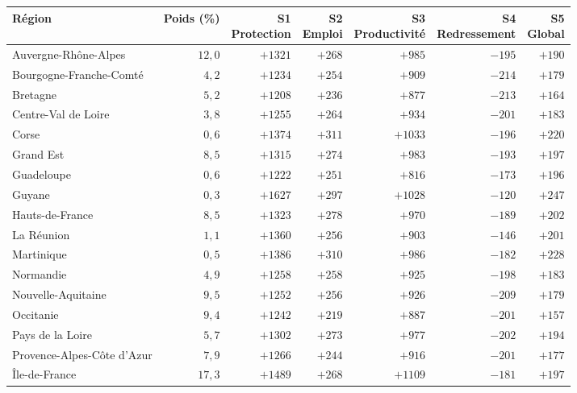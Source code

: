 \begin{tabular}{p{5cm}rrrrrr}\toprule Région & Poids (\%) & \makecell{S1\\Protection} & \makecell{S2\\Emploi} & \makecell{S3\\Productivité} & \makecell{S4\\Redressement} & \makecell{S5\\Global}\\ \midrule
Auvergne-Rhône-Alpes & $12{,}0$ & $+1321$ & $+268$ & $+985$ & $-195$ & $+190$\\
Bourgogne-Franche-Comté & $4{,}2$ & $+1234$ & $+254$ & $+909$ & $-214$ & $+179$\\
Bretagne & $5{,}2$ & $+1208$ & $+236$ & $+877$ & $-213$ & $+164$\\
Centre-Val de Loire & $3{,}8$ & $+1255$ & $+264$ & $+934$ & $-201$ & $+183$\\
Corse & $0{,}6$ & $+1374$ & $+311$ & $+1033$ & $-196$ & $+220$\\
Grand Est & $8{,}5$ & $+1315$ & $+274$ & $+983$ & $-193$ & $+197$\\
Guadeloupe & $0{,}6$ & $+1222$ & $+251$ & $+816$ & $-173$ & $+196$\\
Guyane & $0{,}3$ & $+1627$ & $+297$ & $+1028$ & $-120$ & $+247$\\
Hauts-de-France & $8{,}5$ & $+1323$ & $+278$ & $+970$ & $-189$ & $+202$\\
La Réunion & $1{,}1$ & $+1360$ & $+256$ & $+903$ & $-146$ & $+201$\\
Martinique & $0{,}5$ & $+1386$ & $+310$ & $+986$ & $-182$ & $+228$\\
Normandie & $4{,}9$ & $+1258$ & $+258$ & $+925$ & $-198$ & $+183$\\
Nouvelle-Aquitaine & $9{,}5$ & $+1252$ & $+256$ & $+926$ & $-209$ & $+179$\\
Occitanie & $9{,}4$ & $+1242$ & $+219$ & $+887$ & $-201$ & $+157$\\
Pays de la Loire & $5{,}7$ & $+1302$ & $+273$ & $+977$ & $-202$ & $+194$\\
Provence-Alpes-Côte d'Azur & $7{,}9$ & $+1266$ & $+244$ & $+916$ & $-201$ & $+177$\\
Île-de-France & $17{,}3$ & $+1489$ & $+268$ & $+1109$ & $-181$ & $+197$\\\bottomrule\end{tabular}